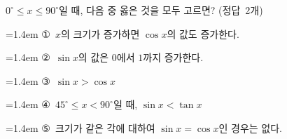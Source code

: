 $0^\circ\le x\le 90^\circ$일 때, 다음 중 옳은 것을 모두 고르면? \mbox{(정답 2개)}
\par\medskip\par\noindent\hangindent=1.4em {\small ①}\ $x$의 크기가 증가하면 $\cos x$의 값도 증가한다.\par\noindent\hangindent=1.4em {\small ②}\ $\sin x$의 값은 $0$에서 $1$까지 증가한다.\par\noindent\hangindent=1.4em {\small ③}\ $\sin x>\cos x$\par\noindent\hangindent=1.4em {\small ④}\ $45^\circ\le x<90^\circ$일 때, $\sin x<\tan x$\par\noindent\hangindent=1.4em {\small ⑤}\ 크기가 같은 각에 대하여 $\sin x=\cos x$인 경우는 없다.\par\medskip
